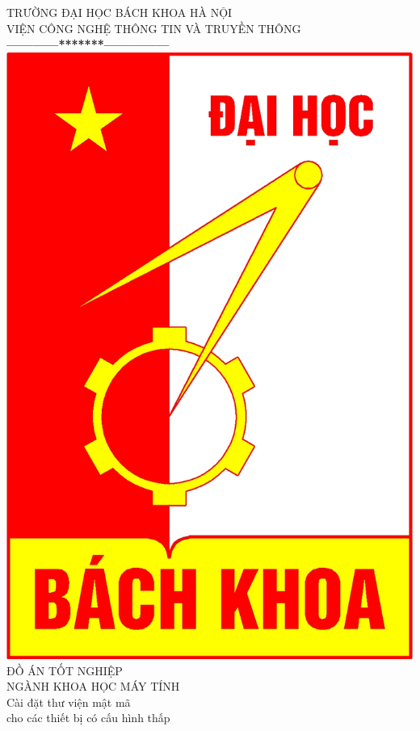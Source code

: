 \documentclass[a4paper,12pt]{report}
\begin{document}
\thispagestyle{empty}
\thisfancypage{
\setlength{\fboxrule}{1pt}
\doublebox}{}

\begin{center}
{\fontsize{16}{19}\selectfont TRƯỜNG ĐẠI HỌC BÁCH KHOA HÀ NỘI\\
VIỆN CÔNG NGHỆ THÔNG TIN VÀ TRUYỀN THÔNG}\\
\textbf{------------*******---------------}\\[1cm]
\includegraphics[scale=0.13]{hust.jpg}\\[1.3cm]
{\fontsize{23}{43}\selectfont ĐỒ ÁN TỐT NGHIỆP}\\[0.1cm]
{\fontsize{25}{10}\selectfont NGÀNH KHOA HỌC MÁY TÍNH}\\[0.9cm]
{\fontsize{20}{24}\selectfont Cài đặt thư viện mật mã\\ cho các thiết bị có cấu hình thấp}\\[2cm]


\end{center}
\end{document}
